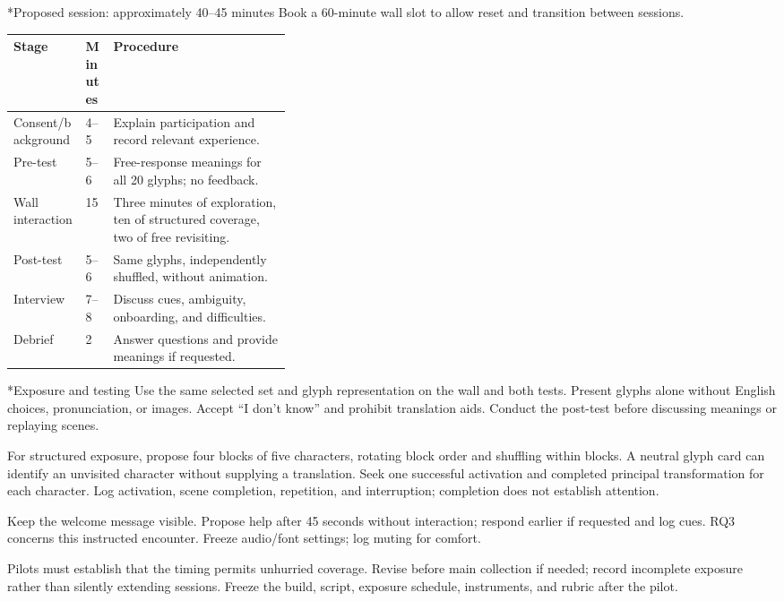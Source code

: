 \documentclass[10pt,letterpaper]{article}
\makeatletter
\renewcommand\section{\@startsection{section}{1}{0pt}{8pt}{4pt}{\normalfont\large\bfseries}}
\makeatother
\begin{document}
\section*{Proposed session: approximately 40--45 minutes}
Book a 60-minute wall slot to allow reset and transition between sessions.

\noindent\begin{tabularx}{\linewidth}{p{0.26\linewidth}p{0.10\linewidth}Y}
\toprule Stage & Minutes & Procedure \\
\midrule
Consent/background & 4--5 & Explain participation and record relevant experience. \\
Pre-test & 5--6 & Free-response meanings for all 20 glyphs; no feedback. \\
Wall interaction & 15 & Three minutes of exploration, ten of structured coverage, two of free revisiting. \\
Post-test & 5--6 & Same glyphs, independently shuffled, without animation. \\
Interview & 7--8 & Discuss cues, ambiguity, onboarding, and difficulties. \\
Debrief & 2 & Answer questions and provide meanings if requested. \\
\bottomrule
\end{tabularx}


\section*{Exposure and testing}
Use the same selected set and glyph representation on the wall and both tests. Present glyphs alone without English choices, pronunciation, or images. Accept ``I don't know'' and prohibit translation aids. Conduct the post-test before discussing meanings or replaying scenes.

For structured exposure, propose four blocks of five characters, rotating block order and shuffling within blocks. A neutral glyph card can identify an unvisited character without supplying a translation. Seek one successful activation and completed principal transformation for each character. Log activation, scene completion, repetition, and interruption; completion does not establish attention.

Keep the welcome message visible. Propose help after 45 seconds without interaction; respond earlier if requested and log cues. RQ3 concerns this instructed encounter. Freeze audio/font settings; log muting for comfort.

Pilots must establish that the timing permits unhurried coverage. Revise before main collection if needed; record incomplete exposure rather than silently extending sessions. Freeze the build, script, exposure schedule, instruments, and rubric after the pilot.
\end{document}
